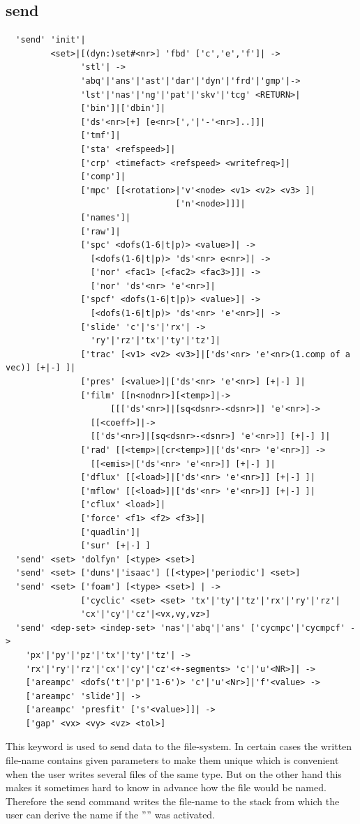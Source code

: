 \documentclass{article}
\begin{document}
\subsection{\label{send}send}
\begin{verbatim}
  'send' 'init'|
         <set>|[(dyn:)set#<nr>] 'fbd' ['c','e','f']| ->
               'stl'| ->
               'abq'|'ans'|'ast'|'dar'|'dyn'|'frd'|'gmp'|->
               'lst'|'nas'|'ng'|'pat'|'skv'|'tcg' <RETURN>|
               ['bin']|['dbin']|
               ['ds'<nr>[+] [e<nr>[','|'-'<nr>]..]]|
               ['tmf']|
               ['sta' <refspeed>]|
               ['crp' <timefact> <refspeed> <writefreq>]|
               ['comp']|
               ['mpc' [[<rotation>|'v'<node> <v1> <v2> <v3> ]|
                                  ['n'<node>]]]|
               ['names']|
               ['raw']|
               ['spc' <dofs(1-6|t|p)> <value>]| ->
                 [<dofs(1-6|t|p)> 'ds'<nr> e<nr>]| ->
                 ['nor' <fac1> [<fac2> <fac3>]]| ->
                 ['nor' 'ds'<nr> 'e'<nr>]|
               ['spcf' <dofs(1-6|t|p)> <value>]| ->
                 [<dofs(1-6|t|p)> 'ds'<nr> 'e'<nr>]| ->
               ['slide' 'c'|'s'|'rx'| ->
                 'ry'|'rz'|'tx'|'ty'|'tz']|
               ['trac' [<v1> <v2> <v3>]|['ds'<nr> 'e'<nr>(1.comp of a vec)] [+|-] ]|
               ['pres' [<value>]|['ds'<nr> 'e'<nr>] [+|-] ]|
               ['film' [[n<nodnr>][<temp>]|->
                     [[['ds'<nr>]|[sq<dsnr>-<dsnr>]] 'e'<nr>]->
                 [[<coeff>]|->
                 [['ds'<nr>]|[sq<dsnr>-<dsnr>] 'e'<nr>]] [+|-] ]| 
               ['rad' [[<temp>|[cr<temp>]|['ds'<nr> 'e'<nr>]] ->
                 [[<emis>|['ds'<nr> 'e'<nr>]] [+|-] ]|
               ['dflux' [[<load>]|['ds'<nr> 'e'<nr>]] [+|-] ]|
               ['mflow' [[<load>]|['ds'<nr> 'e'<nr>]] [+|-] ]|
               ['cflux' <load>]| 
               ['force' <f1> <f2> <f3>]|
               ['quadlin']|
               ['sur' [+|-] ]
  'send' <set> 'dolfyn' [<type> <set>] 
  'send' <set> ['duns'|'isaac'] [[<type>|'periodic'] <set>] 
  'send' <set> ['foam'] [<type> <set>] | ->
               ['cyclic' <set> <set> 'tx'|'ty'|'tz'|'rx'|'ry'|'rz'|
               'cx'|'cy'|'cz'|<vx,vy,vz>] 
  'send' <dep-set> <indep-set> 'nas'|'abq'|'ans' ['cycmpc'|'cycmpcf' ->
    'px'|'py'|'pz'|'tx'|'ty'|'tz'| ->
    'rx'|'ry'|'rz'|'cx'|'cy'|'cz'<+-segments> 'c'|'u'<NR>]| ->
    ['areampc' <dofs('t'|'p'|'1-6')> 'c'|'u'<Nr>]|'f'<value> ->
    ['areampc' 'slide']| ->
    ['areampc' 'presfit' ['s'<value>]]| ->
    ['gap' <vx> <vy> <vz> <tol>] 
\end{verbatim}
This keyword is used to send data to the file-system. In certain cases the written file-name contains given parameters to make them unique which is convenient when the user writes several files of the same type. But on the other hand this makes it sometimes hard to know in advance how the file would be named. Therefore the send command writes the file-name to the stack from which the user can derive the name if the '''' was activated.
\end{document}
